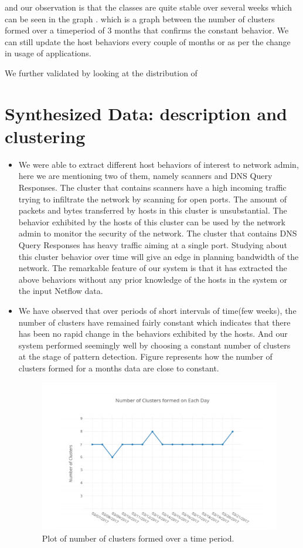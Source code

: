 and our observation is that the classes are quite stable over 
several weeks which can be seen in the graph . 
which is a graph between the number of clusters formed over a timeperiod of 3 months that confirms the constant behavior.
We can still update the host behaviors every couple of months or as per the change in usage of applications.

We further validated by looking at the distribution of 

\section{Synthesized Data: description and clustering}


\begin{itemize}
\item We were able to extract different host behaviors of interest to network admin, here we are mentioning two of them, namely scanners and DNS Query Responses. The cluster that contains scanners have a high incoming traffic trying to infiltrate the
network by scanning for open ports. The amount of packets and bytes transferred by hosts in this cluster is unsubstantial. The behavior exhibited by the hosts of this
cluster can be used by the network admin to monitor the security of the network.
The cluster that contains DNS Query Responses has heavy traffic aiming at a single
port. Studying about this cluster behavior over time will give an edge in planning
bandwidth of the network. The remarkable feature of our system is that it has extracted
the above behaviors without any prior knowledge of the hosts in the system or the input Netflow data.
\item We have observed that over periods of short intervals of time(few weeks), the number
of clusters have remained fairly constant which indicates that there has been no
rapid change in the behaviors exhibited by the hosts. And our system performed
seemingly well by choosing a constant number of clusters at the stage of pattern
detection. Figure  represents how the number of clusters formed for a months
data are close to constant.

\begin{figure}[t]
	\centerline{\includegraphics{constant.png}}
	\caption{ Plot of number of clusters formed over a time period.}%
\end{figure}


\end{itemize}
